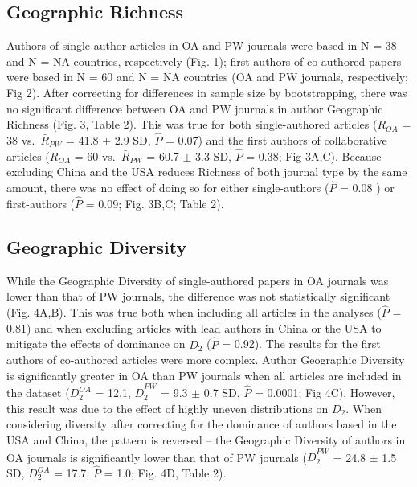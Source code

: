 \documentclass[
  english,
  man]{apa6}
\begin{document}
\hypertarget{geographic-richness}{%
\subsection{Geographic Richness}\label{geographic-richness}}

Authors of single-author articles in OA and PW journals were based in N = 38 and N = NA countries, respectively (Fig. 1); first authors of co-authored papers were based in N = 60 and N = NA countries (OA and PW journals, respectively; Fig 2). After correcting for differences in sample size by bootstrapping, there was no significant difference between OA and PW journals in author Geographic Richness (Fig. 3, Table 2). This was true for both single-authored articles (\(R_{OA}\) = 38 vs.~\(\bar{R}_{PW}\) = 41.8 \(\pm\) 2.9 SD, \(\hat{P}\) = 0.07) and the first authors of collaborative articles (\(R_{OA}\) = 60 vs.~\(\bar{R}_{PW}\) = 60.7 \(\pm\) 3.3 SD, \(\hat{P}\) = 0.38; Fig 3A,C). Because excluding China and the USA reduces Richness of both journal type by the same amount, there was no effect of doing so for either single-authors (\(\hat{P}\) = 0.08 ) or first-authors (\(\hat{P}\) = 0.09; Fig. 3B,C; Table 2).

\hypertarget{geographic-diversity}{%
\subsection{Geographic Diversity}\label{geographic-diversity}}

While the Geographic Diversity of single-authored papers in OA journals was lower than that of PW journals, the difference was not statistically significant (Fig. 4A,B). This was true both when including all articles in the analyses (\(\hat{P}\) = 0.81) and when excluding articles with lead authors in China or the USA to mitigate the effects of dominance on \(D_2\) (\(\hat{P}\) = 0.92). The results for the first authors of co-authored articles were more complex. Author Geographic Diversity is significantly greater in OA than PW journals when all articles are included in the dataset (\(D_2^{OA}\) = 12.1, \(\bar{D}_2^{PW}\) = 9.3 \(\pm\) 0.7 SD, \(\hat{P}\) = 0.0001; Fig 4C). However, this result was due to the effect of highly uneven distributions on \(D_{2}\). When considering diversity after correcting for the dominance of authors based in the USA and China, the pattern is reversed -- the Geographic Diversity of authors in OA journals is significantly lower than that of PW journals (\(\bar{D}_2^{PW}\) = 24.8 \(\pm\) 1.5 SD, \(D_2^{OA}\) = 17.7, \(\hat{P}\) = 1.0; Fig. 4D, Table 2).
\end{document}
